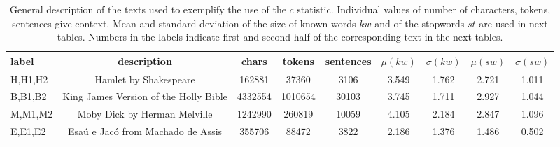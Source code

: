 \begin{table*}[h!]
\begin{center}
\begin{tabular}{| l | c | c | c | c | c | c | c | c |}\hline
label & description & chars & tokens & sentences & $\mu(kw)$ & $\sigma(kw)$ & $\mu(sw)$ & $\sigma(sw)$ \\\hline
H,H1,H2 & Hamlet by Shakespeare & 162881 & 37360 & 3106 & 3.549 & 1.762 & 2.721 & 1.011 \\\hline
B,B1,B2 & King James Version of the Holly Bible & 4332554 & 1010654 & 30103 & 3.745 & 1.711 & 2.927 & 1.044 \\\hline
M,M1,M2 & Moby Dick by Herman Melville & 1242990 & 260819 & 10059 & 4.105 & 2.184 & 2.847 & 1.096 \\\hline
E,E1,E2 & Esa\'u e Jac\'o from Machado de Assis & 355706 & 88472 & 3822 & 2.186 & 1.376 & 1.486 & 0.502 \\\hline
\end{tabular}
\caption{General description of the texts used to exemplify the use of the $c$ statistic.
Individual values of number of characters, tokens, sentences give context.
Mean and standard deviation of the size of known words $kw$ and of the stopwords
$st$ are used in next tables.
Numbers in the labels indicate first and second half of the corresponding text in the next tables.}
\end{center}
\end{table*}